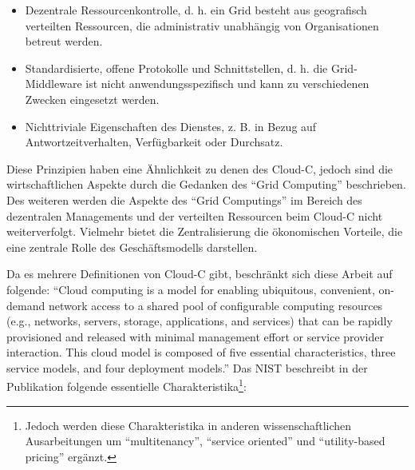 \begin{itemize}
	\item Dezentrale Ressourcenkontrolle, d. h. ein Grid besteht aus geografisch verteilten Ressourcen, die administrativ unabhängig von Organisationen betreut werden.	
	\item Standardisierte, offene Protokolle und Schnittstellen, d. h. die Grid-Middleware
	ist nicht anwendungsspezifisch und kann zu verschiedenen Zwecken eingesetzt
	werden.
	\item Nichttriviale Eigenschaften des Dienstes, z. B. in Bezug auf Antwortzeitverhalten, Verfügbarkeit oder Durchsatz.
\end{itemize}
Diese Prinzipien haben eine Ähnlichkeit zu denen des \ac{Cloud-C}, jedoch sind die wirtschaftlichen Aspekte durch die Gedanken des \enquote{Grid Computing} beschrieben. Des weiteren werden die Aspekte des \enquote{Grid Computings} im Bereich des dezentralen Managements und der verteilten Ressourcen beim \ac{Cloud-C} nicht weiterverfolgt. Vielmehr bietet die Zentralisierung die ökonomischen Vorteile, die eine zentrale Rolle des Geschäftsmodells darstellen. \par
Da es mehrere Definitionen von \ac{Cloud-C} gibt, beschränkt sich diese Arbeit auf folgende: \enquote{Cloud computing is a model for enabling ubiquitous, convenient, on-demand network access to a shared pool of configurable computing resources (e.g., networks, servers, storage, applications, and services) that can be rapidly provisioned and released with minimal management effort or service provider interaction. This cloud model is composed of five essential characteristics, three service models, and four deployment models.}\autocite[][S.2]{mell_nist_2011} Das \ac{NIST} beschreibt in der Publikation \cite{mell_nist_2011} folgende essentielle Charakteristika\footnote{Jedoch werden diese Charakteristika in anderen wissenschaftlichen Ausarbeitungen um \enquote{multitenancy}, \enquote{service oriented} und \enquote{utility-based pricing} ergänzt.\autocite[vgl.][S.1]{institute_of_electrical_and_electronics_engineers_cloud_2011}}: 

